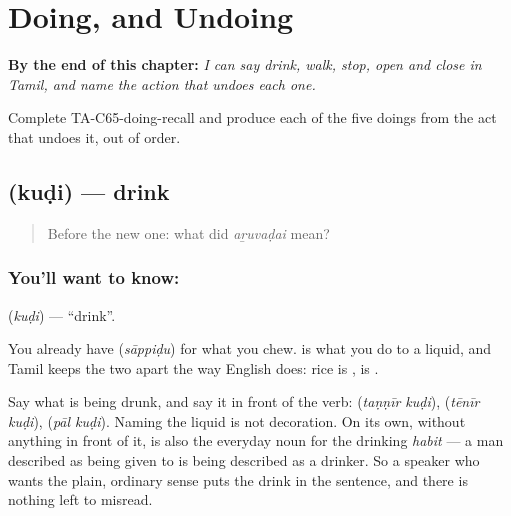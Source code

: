 
\chapter{Doing, and Undoing}
\label{ch:ta-doing-and-undoing}

\begin{chapteropening}
\textbf{By the end of this chapter:} \emph{I can say drink, walk, stop, open and close in Tamil, and name the action that undoes each one.}

Complete TA-C65-doing-recall and produce each of the five doings from the act that undoes it, out of order.
\end{chapteropening}

\section[\texorpdfstring{\ta{குடி} (kuḍi)}{குடி (kuḍi)}]{ (kuḍi) — drink}

\label{lesson:TA-C65-drink}



\begin{quote}
Before the new one: what did \emph{aṟuvaḍai} mean?
\end{quote}

\subsection*{You'll want to know: }
\textbf{} (\emph{kuḍi}) — \textquotedblleft{}drink\textquotedblright{}.

You already have  (\emph{sāppiḍu}) for what you chew.  is what you do to a liquid, and Tamil keeps the two apart the way English does: rice is ,  is .

Say what is being drunk, and say it in front of the verb: \textbf{ } (\emph{taṇṇīr kuḍi}), \textbf{ } (\emph{tēnīr kuḍi}), \textbf{ } (\emph{pāl kuḍi}). Naming the liquid is not decoration. On its own, without anything in front of it,  is also the everyday noun for the drinking \emph{habit} — a man described as being given to  is being described as a drinker. So a speaker who wants the plain, ordinary sense puts the drink in the sentence, and there is nothing left to misread.

